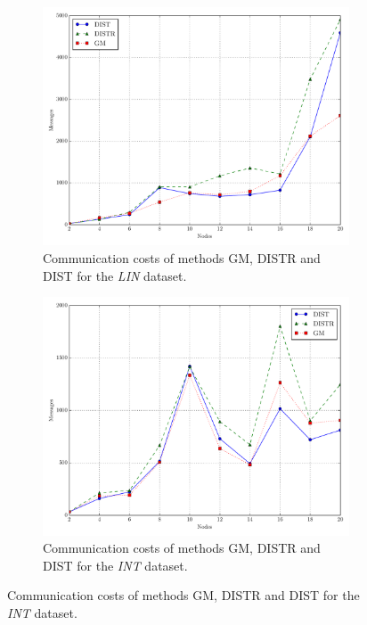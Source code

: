 \begin{figure}[!t]
\begin{subfigure}{0.32\textwidth}
  \includegraphics[width=\linewidth]{img/matching_msg_linear.pdf}
  \caption{Communication costs of methods GM, DISTR and DIST for the \emph{LIN} dataset.}
\end{subfigure}\hfill
\begin{subfigure}{0.32\textwidth}
  \includegraphics[width=\linewidth]{img/matching_msg_interweaving.pdf}
  \caption{Communication costs of methods GM, DISTR and DIST for the \emph{INT} dataset.}
\end{subfigure}\hfill

\end{figure}
